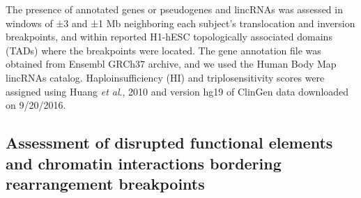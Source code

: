 \documentclass[a4paper,twoside=true,openright,parskip=full,chapterprefix=true,11pt,headings=normal,bibliography=totoc,listof=totoc,titlepage=on,captions=tableabove,draft=false]{scrreprt}
\theoremstyle{definition}
\theoremstyle{definition}
\theoremstyle{definition}
\theoremstyle{remark}
\begin{document}
The presence of annotated genes or pseudogenes and lincRNAs was assessed
in windows of ±3 and ±1 Mb neighboring each subject's translocation and
inversion breakpoints, and within reported H1-hESC topologically
associated domains (TADs)\citep{Dixon2012} where the breakpoints were
located. The gene annotation file was obtained from Ensembl GRCh37
archive,\citep{Flicek2014} and we used the Human Body Map lincRNAs
catalog.\citep{Cabili2011} Haploinsufficiency (HI) and triplosensitivity
scores were assigned using Huang \emph{et al}., 2010\citep{Huang2010}
and version hg19 of ClinGen\citep{Rehm2015} data downloaded on
9/20/2016.

\hypertarget{assessment-of-disrupted-functional-elements-and-chromatin-interactions-bordering-rearrangement-breakpoints}{%
\subsection{Assessment of disrupted functional elements and chromatin
interactions bordering rearrangement
breakpoints}\label{assessment-of-disrupted-functional-elements-and-chromatin-interactions-bordering-rearrangement-breakpoints}}
\end{document}
